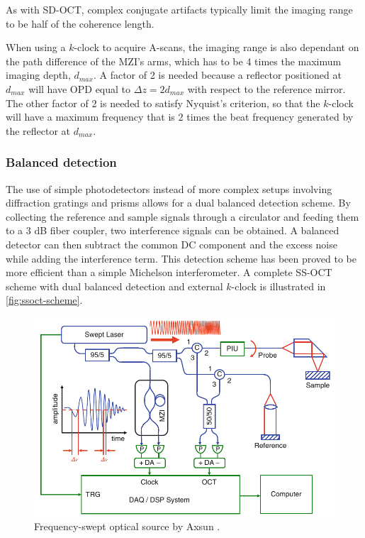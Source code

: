 As with \ac{SD-OCT}, complex conjugate artifacts typically limit the imaging range to be half of the coherence length. 

When using a $k$-clock to acquire A-scans, the imaging range is also dependant on the path difference of the \ac{MZI}'s arms, which has to be 4 times the maximum imaging depth, $d_{max}$. A factor of 2 is needed because a reflector positioned at $d_{max}$ will have \ac{OPD} equal to $\Delta z = 2d_{max}$ with respect to the reference mirror. The other factor of 2 is needed to satisfy Nyquist's criterion, so that the $k$-clock will have a maximum frequency that is 2 times the beat frequency generated by the reflector at $d_{max}$. 

\subsubsection{Balanced detection}
The use of simple photodetectors instead of more complex setups involving diffraction gratings and prisms allows for a dual balanced detection scheme. By collecting the reference and sample signals through a circulator and feeding them to a 3 dB fiber coupler, two interference signals can be obtained. A balanced detector can then subtract the common DC component and the excess noise while adding the interference term. This detection scheme has been proved to be more efficient than a simple Michelson interferometer. A complete \ac{SS-OCT} scheme with dual balanced detection and external $k$-clock is illustrated in \autoref{fig:ssoct-scheme}.

\begin{figure}[hbt]
	\myfloatalign
	\includegraphics[width=\linewidth]{gfx/ch2/ssoct-scheme}
	\caption{Frequency-swept optical source by Axsun \cite{Drexler2015}.}\label{fig:ssoct-scheme}
\end{figure}
